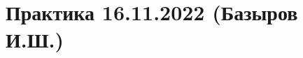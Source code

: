 \documentclass[main.tex]{subfiles}
\begin{document}

\section{Практика 16.11.2022 (Базыров И.Ш.)}
\end{document}
